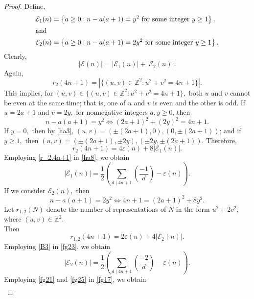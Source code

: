 \documentclass[12pt]{article}
\numberwithin{equation}{section}
\theoremstyle{definition}
\theoremstyle{remark}
\numberwithin{equation}{section}
\begin{document}
\begin{proof}
Define, 
\begin{align}
\label{fg15}\mathcal{E}_1(n)
&=
\left\{
a\geq0:
n-a(a+1)=y^2
\text{ for some integer } y\geq1
\right\},\\
\intertext{and}
\label{fg16}\mathcal{E}_2(n)
&=
\left\{
a\geq0:
n-a(a+1)=2y^2
\text{ for some integer } y\geq1
\right\}.
\end{align}
Clearly, 
\begin{equation}\label{fg17}
|\mathcal{E}(n)|=|\mathcal{E}_1(n)|+|\mathcal{E}_2(n)|.
\end{equation}
Again,
$$r_2(4n+1)
=|\{(u,v)\in\mathbb Z^2:u^2+v^2=4n+1\}|.$$
This implies, for $(u,v)\in \{(u,v)\in\mathbb Z^2:u^2+v^2=4n+1\},$ 
both $u$ and $v$ cannot be even at the same time; that is, one of   $u$ and $v$ is even and the other is  odd. If $u=2a+1$ and $v=2y,$ for nonnegative integers $a,y\geq0$,  then 
\begin{equation}\label{ha3}
n-a(a+1)=y^2\iff
(2a+1)^2+(2y)^2=4n+1 .
\end{equation}
If $y=0,$ then by  \eqref{ha3},  $(u,v)=(\pm(2a+1),0),(0,\pm(2a+1))$; and if  $y\geq1,$ then  $(u,v)=(\pm(2a+1),\pm 2y),(\pm 2y,\pm(2a+1)).$
Therefore,
\begin{equation}\label{ha8}
r_2(4n+1)
=
4\varepsilon(n)+8|\mathcal E_1(n)|.
\end{equation}
Employing \eqref{r_2.4n+1} in \eqref{ha8}, we obtain
\begin{equation}
    |\mathcal E_1(n)|
=
\dfrac{1}{2}
\left(
\sum_{d\mid 4n+1}\left(\dfrac{-1}{d}\right)
-
\varepsilon(n)
\right).
\label{fg21}
\end{equation}
If we consider  $\mathcal{E}_2(n),$ then 
\begin{equation}\label{fg22}
n-a(a+1)=2y^2
\Longleftrightarrow
4n+1=(2a+1)^2+8y^2.
\end{equation}
Let $r_{1,2}(N)$ denote the number of representations of $N$ in the form $u^2+2v^2,$ where $(u,v)\in\mathbb{Z}^2.$\\ Then
\begin{equation}\label{fg23}
r_{1,2}(4n+1)=2\varepsilon(n)+4|\mathcal{E}_2(n)|.
\end{equation}
Employing \eqref{B3} in \eqref{fg23}, we obtain
\begin{equation}\label{fg25}
|\mathcal{E}_2(n)|
=
\dfrac{1}{2}
\left(
\sum_{d\mid 4n+1}\left(\dfrac{-2}{d}\right)
-
\varepsilon(n)
\right).
\end{equation}
Employing \eqref{fg21} and \eqref{fg25} in  \eqref{fg17},  we obtain
\begin{align}

\end{align}
\end{proof}
\end{document}
